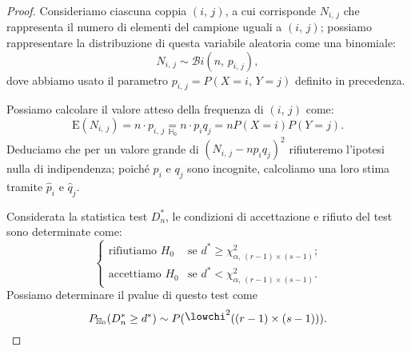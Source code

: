         \begin{proof}
            Consideriamo ciascuna coppia $(i,\,j)$, a cui corrisponde $N_{i,\,j}$ che rappresenta il numero di 
            elementi del campione uguali a $(i,\,j)$; possiamo rappresentare la distribuzione di questa variabile 
            aleatoria come una binomiale: \[
                N_{i,\,j} \sim \mathcal{B}i(n,\,p_{i,\,j})
            ,\] dove abbiamo usato il parametro $p_{i,\,j} = P(X=i,\,Y=j)$ definito in precedenza.

            Possiamo calcolare il valore atteso della frequenza di $(i,\,j)$ come: \[
                \text{E}(N_{i,\,j}) = n\cdot p_{i,\,j} \underset{\mathbb{H}_0}{=} n \cdot p_i q_j = nP(X=i)P(Y=j)
            .\] Deduciamo che per un valore grande di $(N_{i,\,j} - np_iq_j)^2$ rifiuteremo l'ipotesi nulla di 
            indipendenza; poiché $p_i$ e $q_j$ sono incognite, calcoliamo una loro stima tramite 
            $\hat{p}_i$ e $\hat{q}_j$.

            Considerata la statistica test $D_n^*$, le condizioni di accettazione e rifiuto del test sono determinate 
            come: \[
                \begin{cases}
                    \text{rifiutiamo } H_0 & 
                    \text{se $d^* \geq \chi^2_{\alpha,\,(r-1)\times (s-1)}$;} \\
                    \text{accettiamo } H_0 & 
                    \text{se $d^* < \chi^2_{\alpha,\,(r-1)\times (s-1)}$.}
                \end{cases}
            \] Possiamo determinare il p\nbdash value di questo test come \[
            P_{\mathbb{H}_0}(D_n^* \geq d^*) \sim P(\chi^2((r-1)\times (s-1)))
            .\qedhere\] 
        \end{proof}
